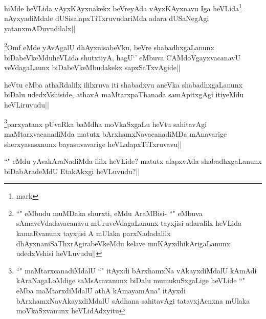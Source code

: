 \begin{artha}
hiMde heVLida vAyxKAyxnakekx beVreyAda vAyxKAyxnavu Iga heVLida\footnote{mark} nAyxyadiMdale dUSisalapxTiTxruvudariMda adara dUSaNegAgi yatanxmADuvudilalx||
\end{artha}




\begin{artha}
\footnote{``\stext" eMbudu muMDaka shurxti, \stext eMdu AraMBisi- ``\stext" eMbuva sAmaveVdadavacanavu mUruveVdagaLanunx tayxjisi adaralilx heVLida kamaRvanunx tayxjisi A mUlaka parxNadadalilx dhAyxnaniSaThxrAgirabeVkeMdu kelave muKAyxdhikArigaLanunx udedxVshisi heVLuvudu||}Omf eMde yAvAgalU dhAyxnisabeVku, beVre shabadhxgaLanunx biDabeVkeMduheVLida shutxtiyA, hagU`\stext' eMbuva CAMdoVgayxvacanavU veVdagaLaunx biDabeVkeMbudakekx sapxSaTxvAgide||
\end{artha}


\begin{artha}
heVtu eMba athaRdalilx ililxruva iti shabadxvu aneVka shabadhxgaLanunx biDalu udedxVshiside, athavA maMtarxpaThanada samApitxgAgi itiyeMdu heVLiruvudu||
\end{artha}


\begin{artha}
\footnote{``\stext" maMtarxcanadiMdalU ``\stext" itAyxdi bArxhamxNa vAkayxdiMdalU kAmAdi kAraNagaLoMdige saMsAravanunx biDalu mumukuSxgaLige heVLide ``\stext" eMba maMtarxdiMdalU athA kAmayamAna" itAyxdi bArxhamxNavAkayxdiMdalU sAdhana sahitavAgi tatavxjAcnxna mUlaka moVkaSxvanunx heVLidAdxyitu}parxyatanx pUvaRka baMdha moVkaSxgaLu heVtu sahitavAgi maMtarxvacanadiMda matutx bArxhamxNavacanadiMDa mAnavarige sherxyasasxnunx bayasuvavarige heVLalapxTiTxruvavu||
\end{artha}


\begin{artha}
``\stext" eMdu yAvakAraNadiMda ililx heVLide? matutx alapxvAda shabadhxgaLanunx biDabAradeMdU EtakAkxgi heVLuvudu?||
\end{artha}

